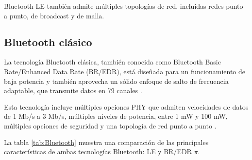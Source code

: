 Bluetooth LE también admite múltiples topologías de red, incluidas redes punto a punto, de broadcast y de malla.


\subsection{Bluetooth clásico}

La tecnología Bluetooth clásica, también conocida como Bluetooth Basic Rate/Enhanced Data Rate (BR/EDR), está diseñada para un funcionamiento de baja potencia y también aprovecha un sólido enfoque de salto de frecuencia adaptable, que transmite datos en 79 canales \cite{bluetooth}.

Esta tecnología incluye múltiples opciones PHY que admiten velocidades de datos de 1 Mb/s a 3 Mb/s, múltiples niveles de potencia, entre 1 mW y 100 mW, múltiples opciones de seguridad y una topología de red punto a punto \cite{bluetooth}.

La tabla \ref{tab:Bluetooth} muestra una comparación de las principales características de ambas tecnologías Bluetooth: LE y BR/EDR $\pi$.

